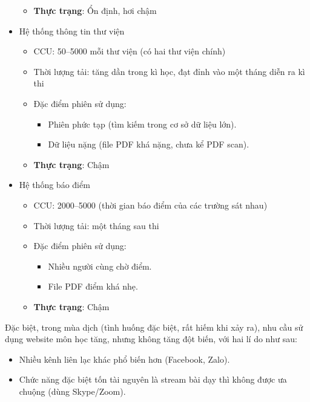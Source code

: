 \documentclass{article}
\begin{document}
\begin{itemize}
\begin{itemize}
\begin{itemize}
                \end{itemize}
            \item \textbf{Thực trạng}: Ổn định, hơi chậm
        \end{itemize}
    \item Hệ thống thông tin thư viện
        \begin{itemize}
            \item CCU\@: 50--5000 mỗi thư viện (có hai thư viện chính)
            \item Thời lượng tải: tăng dần trong kì học, đạt đỉnh vào một tháng
                diễn ra kì thi
            \item Đặc điểm phiên sử dụng:
                \begin{itemize}
                    \item Phiên phức tạp (tìm kiếm trong cơ sở dữ liệu lớn).
                    \item Dữ liệu nặng (file PDF khá nặng, chưa kể PDF scan).
                \end{itemize}
            \item \textbf{Thực trạng}: Chậm
        \end{itemize}
    \item Hệ thống báo điểm
        \begin{itemize}
            \item CCU\@: 2000--5000 (thời gian báo điểm của các trường sát nhau)
            \item Thời lượng tải: một tháng sau thi
            \item Đặc điểm phiên sử dụng:
                \begin{itemize}
                    \item Nhiều người cùng chờ điểm.
                    \item File PDF điểm khá nhẹ.
                \end{itemize}
            \item \textbf{Thực trạng}: Chậm
        \end{itemize}
\end{itemize}

Đặc biệt, trong mùa dịch (tình huống đặc biệt, rất hiếm khi xảy ra), nhu cầu sử
dụng website môn học tăng, nhưng không tăng đột biến, với hai lí do như sau:

\begin{itemize}
    \item Nhiều kênh liên lạc khác phổ biến hơn (Facebook, Zalo).
    \item Chức năng đặc biệt tốn tài nguyên là stream bài dạy thì không được ưa
        chuộng (dùng Skype/Zoom).
\end{itemize}
\end{document}
